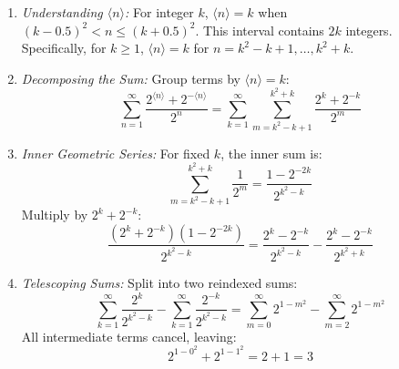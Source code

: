 \begin{solution}
    \begin{enumerate}
        \item \textit{Understanding \( \langle n \rangle \):} For integer \( k \), \( \langle n \rangle = k \) when \( \left(k - 0.5\right)^2 < n \leq \left(k + 0.5\right)^2 \). This interval contains \( 2k \) integers. Specifically, for \( k \geq 1 \), \( \langle n \rangle = k \) for \( n = k^2 - k + 1, \ldots, k^2 + k \).

        \item \textit{Decomposing the Sum:} Group terms by \( \langle n \rangle = k \):
            \[
                \sum_{n=1}^{\infty} \frac{2^{\langle n \rangle} + 2^{-\langle n \rangle}}{2^n} = \sum_{k=1}^{\infty} \sum_{m=k^2 - k + 1}^{k^2 + k} \frac{2^k + 2^{-k}}{2^m}
            \]

        \item \textit{Inner Geometric Series:} For fixed \( k \), the inner sum is:
            \[
                \sum_{m=k^2 - k + 1}^{k^2 + k} \frac{1}{2^m} = \frac{1 - 2^{-2k}}{2^{k^2 - k}}
            \]
            Multiply by \( 2^k + 2^{-k} \):
            \[
                \frac{\left(2^k + 2^{-k}\right)\left(1 - 2^{-2k}\right)}{2^{k^2 - k}} = \frac{2^k - 2^{-k}}{2^{k^2 - k}} - \frac{2^k - 2^{-k}}{2^{k^2 + k}}
            \]

        \item \textit{Telescoping Sums:} Split into two reindexed sums:
            \[
                \sum_{k=1}^{\infty} \frac{2^k}{2^{k^2 - k}} - \sum_{k=1}^{\infty} \frac{2^{-k}}{2^{k^2 - k}} = \sum_{m=0}^{\infty} 2^{1 - m^2} - \sum_{m=2}^{\infty} 2^{1 - m^2}
            \]
            All intermediate terms cancel, leaving:
            \[
                2^{1 - 0^2} + 2^{1 - 1^2} = 2 + 1 = 3
            \]

    \end{enumerate}
\end{solution}
